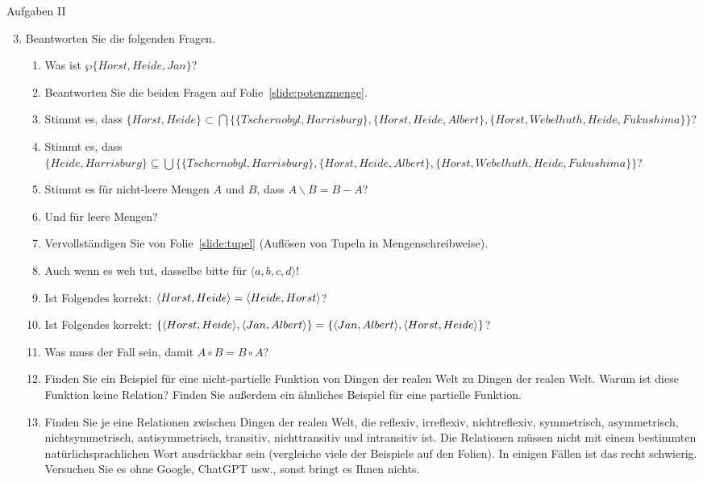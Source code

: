 \begin{frame}
  {Aufgaben II}
  \begin{enumerate}[<+->]\setcounter{enumi}{2}\scriptsize
    \item Beantworten Sie die folgenden Fragen.
      \Viertelzeile
      \begin{enumerate}[<+->]\scriptsize
        \item Was ist $\wp\{Horst,Heide,Jan\}$?
        \item Beantworten Sie die beiden Fragen auf Folie~\ref{slide:potenzmenge}.
        \item Stimmt es, dass $\{Horst,Heide\}\subset\bigcap\{\{Tschernobyl,Harrisburg\},\{Horst,Heide,Albert\},\{Horst,Webelhuth,Heide,Fukushima\}\}$?
        \item Stimmt es, dass $\{Heide,Harrisburg\}\subseteq\bigcup\{\{Tschernobyl,Harrisburg\},\{Horst,Heide,Albert\},\{Horst,Webelhuth,Heide,Fukushima\}\}$?
        \item Stimmt es für nicht-leere Mengen $A$ und $B$, dass $A\backslash B=B-A$?
        \item Und für leere Mengen?
        \item Vervollständigen Sie von Folie~\ref{slide:tupel}  (Auflösen von Tupeln in Mengenschreibweise).
        \item Auch wenn es weh tut, dasselbe bitte für $\langle a,b,c,d\rangle$!
        \item Ist Folgendes korrekt: $\langle{}Horst,Heide\rangle=\langle{}Heide,Horst\rangle$?
        \item Ist Folgendes korrekt: $\{\langle{}Horst,Heide\rangle,\langle{}Jan,Albert\rangle\}=\{\langle{}Jan,Albert\rangle,\langle{}Horst,Heide\rangle\}$?
        \item Was muss der Fall sein, damit $A\circ B=B\circ A$?
        \item Finden Sie ein Beispiel für eine nicht-partielle Funktion von Dingen der realen Welt zu Dingen der realen Welt. Warum ist diese Funktion keine Relation? Finden Sie außerdem ein ähnliches Beispiel für eine partielle Funktion.
        \item Finden Sie je eine Relationen zwischen Dingen der realen Welt, die reflexiv, irreflexiv, nichtreflexiv, symmetrisch, asymmetrisch, nichtsymmetrisch, antisymmetrisch, transitiv, nichttransitiv und intransitiv ist. Die Relationen müssen nicht mit einem bestimmten natürlichsprachlichen Wort ausdrückbar sein (vergleiche viele der Beispiele auf den Folien). In einigen Fällen ist das recht schwierig. Versuchen Sie es ohne Google, ChatGPT usw., sonst bringt es Ihnen nichts.
      \end{enumerate}
  \end{enumerate}
\end{frame}



